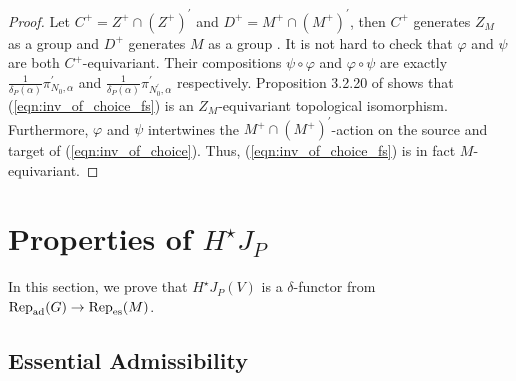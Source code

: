 \documentclass[10pt]{amsart}
\begin{document}
\begin{proof}
Let $C^{+}= Z^{+} \cap (Z^{+})^{\prime}$ and $D^{+}=M^{+}\cap (M^{+})^{\prime}$, then $C^{+}$ generates $Z_{M}$ as a group and $D^{+}$ generates $M$ as a group \cite[Prop. 3.3.2]{Jacquet1}. It is not hard to check that $\varphi$ and $\psi$ are both $C^{+}$-equivariant. Their compositions $\psi\circ \varphi$ and $\varphi \circ \psi$ are exactly $\frac{1}{\delta_{P}(\alpha)}\pi^{\prime}_{N_{0},\alpha}$ and $\frac{1}{\delta_{P}(\alpha)}\pi^{\prime}_{N_{0}^{\prime},\alpha}$ respectively. Proposition 3.2.20 of \cite{Jacquet1} shows that (\ref{eqn:inv_of_choice_fs}) is an $Z_{M}$-equivariant topological isomorphism. Furthermore, $\varphi$ and $\psi$ intertwines the $M^{+}\cap (M^{+})^{\prime}$-action on the source and target of (\ref{eqn:inv_of_choice}). Thus, (\ref{eqn:inv_of_choice_fs}) is in fact $M$-equivariant. 
\end{proof}





\vspace{3mm}
\section{Properties of $H^{\star}J_P$}\label{sec:properties}
In this section, we prove that $H^{\star}J_{P}(V)$ is a $\delta$-functor from $\textnormal{Rep}_{\textnormal{ad}}(G)\rightarrow \textnormal{Rep}_{\textnormal{es}}(M)$. 

\subsection{Essential Admissibility}\label{sec:Essential_Admissibility}
\end{document}
